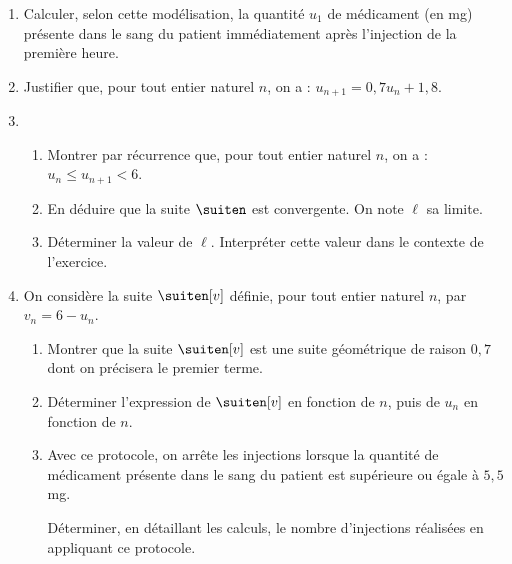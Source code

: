 \begin{enumerate}
	\item Calculer, selon cette modélisation, la quantité $u_1$ de médicament (en mg) présente dans le sang du patient immédiatement après l’injection de la première heure.
	\item Justifier que, pour tout entier naturel $n$, on a : $u_{n+1} = 0,7u_n + 1,8$.
	\item 
	\begin{enumerate}
		\item Montrer par récurrence que, pour tout entier naturel $n$, on a : $u_n \leqslant u_{n+1} < 6$.
		\item En déduire que la suite $\suiten$ est convergente. On note $\ell$ sa limite. 
		\item Déterminer la valeur de $\ell$. Interpréter cette valeur dans le contexte de l’exercice. 
	\end{enumerate}
	\item On considère la suite $\suiten[v]$ définie, pour tout entier naturel $n$, par $v_n=6-u_n$.
	\begin{enumerate}
		\item Montrer que la suite $\suiten[v]$ est une suite géométrique de raison $0,7$ dont on précisera le premier
		terme. 
		\item Déterminer l’expression de $\suiten[v]$ en fonction de $n$, puis de $u_n$ en fonction de $n$.
		\item Avec ce protocole, on arrête les injections lorsque la quantité de médicament présente dans le sang du patient est supérieure ou égale à $5,5$ mg.
		
		Déterminer, en détaillant les calculs, le nombre d’injections réalisées en appliquant ce protocole.
	\end{enumerate}
\end{enumerate}


